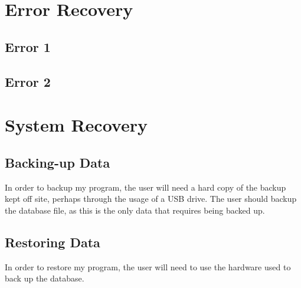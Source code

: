 \section{Error Recovery}

\subsection{Error 1}

\subsection{Error 2}

\section{System Recovery}

\subsection{Backing-up Data}

In order to backup my program, the user will need a hard copy of the backup kept off site, perhaps through the usage of a USB drive. The user should backup the database file, as this is the only data that requires being backed up.

\subsection{Restoring Data}

In order to restore my program, the user will need to use the hardware used to back up the database.